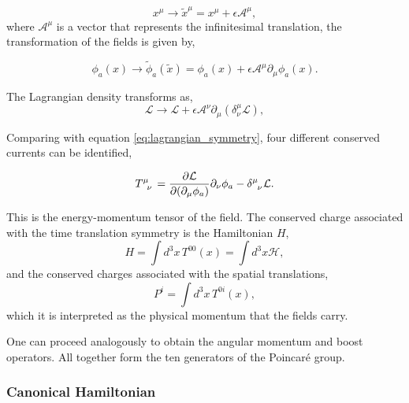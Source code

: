 \documentclass[11pt,a4paper,twoside,pdf]{article}
\numberwithin{equation}{section}
\begin{document}
\begin{equation}
    x^\mu \to \tilde{x}^{\mu} = x^\mu + \epsilon \mathcal{A}^\mu,
\end{equation}
where \(\mathcal{A}^\mu\) is a vector that represents the infinitesimal translation, 
the transformation of the fields is given by,

\begin{equation}
    \phi_a(x) \to \tilde{\phi}_a(\tilde{x}) = \phi_a(x) + \epsilon \mathcal{A}^\mu 
    \partial_\mu \phi_a(x).
\end{equation}

The Lagrangian density transforms as,
\begin{equation}
    \mathcal{L} \to \mathcal{L} + \epsilon \mathcal{A}^\nu \partial_\mu 
    \left(\delta_\nu^\mu \mathcal{L}\right),
\end{equation}

Comparing with equation \eqref{eq:lagrangian_symmetry}, four different conserved
currents can be identified,

\begin{equation}
    \tensor{T}{^\mu_\nu} = \frac{\partial \mathcal{L}}{\partial (\partial_\mu \phi_a)} 
    \partial_\nu \phi_a - \tensor{\delta}{^\mu_\nu} \mathcal{L}.
\end{equation}

This is the energy-momentum tensor of the field. The conserved charge associated with
the time translation symmetry is the Hamiltonian \(H\), 
\begin{equation}
    H = \int d^3x \, T^{00}(x) = \int d^3x \mathcal{H},
    \label{eq:energy_momentum_hamiltonian}
\end{equation}  
and the conserved charges associated with the spatial translations,
\begin{equation}
    P^i = \int d^3x \, T^{0i}(x),
\end{equation}
which it is interpreted as the physical momentum that the fields carry.

One can proceed analogously to obtain the angular momentum and boost operators. All 
together form the ten generators of the Poincaré group.

\subsubsection{Canonical Hamiltonian}\label{sec:canonical_hamiltonian}
\end{document}

